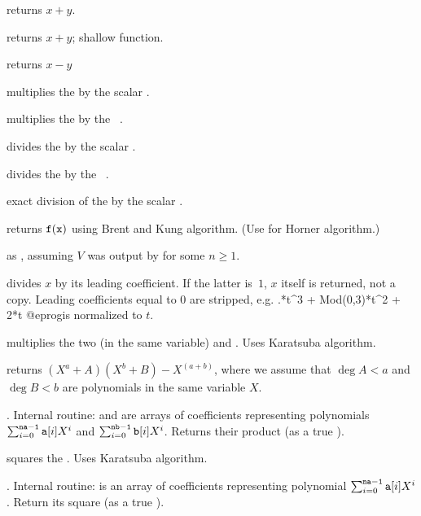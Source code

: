  returns $x+y$.

 returns $x+y$; shallow function.


 returns $x-y$

 multiplies the  
by the scalar .

 multiplies the  
by the ~.

 divides the  
by the scalar .

 divides the  
by the ~.

 exact division of the 
 by the scalar .

 returns ${\tt f}({\tt x})$ using
Brent and Kung algorithm. (Use  for Horner algorithm.)

 as ,
assuming $V$ was output by  for some $n\geq 1$.

 divides $x$ by its
leading coefficient. If the latter is~$1$, $x$ itself is returned, not a
copy. Leading coefficients equal to $0$ are stripped, e.g.
.*t^3 + Mod(0,3)*t^2 + 2*t
@eprog\noindent is normalized to $t$.

 multiplies the two  (in the same
variable)  and . Uses Karatsuba algorithm.

returns $(X^a + A)(X^b + B) - X^(a+b)$, where we assume that $\deg A < a$
and $\deg B < b$ are polynomials in the same variable $X$.

. Internal routine:
 and  are arrays of coefficients representing polynomials
$\sum_{i = 0}^{{\tt na-1}} {\tt a}[i] X^i$ and
$\sum_{i = 0}^{{\tt nb-1}} {\tt b}[i] X^i$. Returns their product (as a true
).

 squares the  . Uses Karatsuba
algorithm.

. Internal routine:
 is an array of coefficients representing polynomial
$\sum_{i = 0}^{{\tt na-1}} {\tt a}[i] X^i$. Return its square (as a true
).

